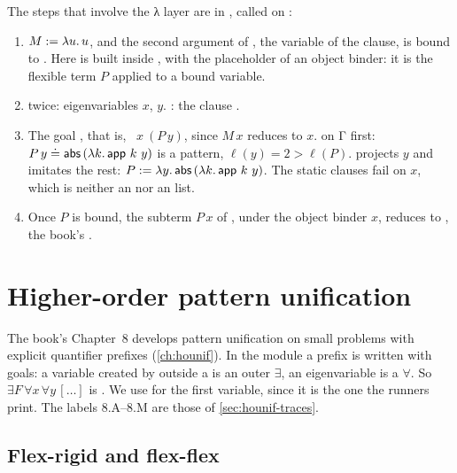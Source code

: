 {\begin{tutorial}
The steps that involve the λ layer are in , called on :
\begin{enumerate}
  \item $M:=\lambda u.\,u$, and the second argument of , the variable  of the clause, is bound to
    . Here  is built inside , with
     the placeholder of an object binder: it is the flexible term $P$ applied to a bound
    variable.
  \item {} twice: eigenvariables $x$, $y$. : the clause
    .
  \item The goal , that is, ~$x\ (P\,y)$, since $M\,x$
    reduces to $x$.  on Γ first: $P\,y\doteq\cst{abs}\,(\abs{k}{\cst{app}\ k\ y})$
    is a pattern, $\ell(y)=2>\ell(P)$.  projects $y$ and imitates the rest:
    $P:=\abs{y}{\cst{abs}\,(\abs{k}{\cst{app}\ k\ y})}$. The static clauses fail on $x$, which is
    neither an  nor an  list.
  \item Once $P$ is bound, the subterm $P\,x$ of , under the object binder $x$, reduces to
    , the book's .
\end{enumerate}
\end{tutorial}

\section{Higher-order pattern unification}\label{sec:examples-unif}

The book's Chapter~8 develops pattern unification on small problems with explicit quantifier prefixes
(\cref{ch:hounif}). In the module a prefix is written with goals: a variable created by 
outside a  is an outer $\exists$, an eigenvariable is a $\forall$. So
$\exists F\,\forall x\,\forall y\,[\dots]$ is . We use  for the
first variable, since it is the one the runners print. The labels 8.A--8.M are those of
\cref{sec:hounif-traces}.

\subsection{Flex-rigid and flex-flex}

}
